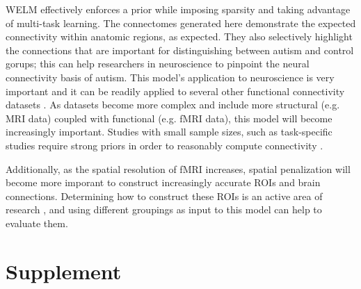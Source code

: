 \documentclass{article}
\begin{document}
WELM effectively enforces a prior while imposing sparsity and taking advantage of multi-task learning. The connectomes generated here demonstrate the expected connectivity within anatomic regions, as expected. They also selectively highlight the connections that are important for distinguishing between autism and control gorups; this can help researchers in neuroscience to pinpoint the neural connectivity basis of autism. This model's application to neuroscience is very important and it can be readily applied to several other functional connectivity datasets \cite{milham2012adhd,smith2013resting}. As datasets become more complex and include more structural (e.g. MRI data) coupled with functional (e.g. fMRI data), this model will become increasingly important. Studies with small sample sizes, such as task-specific studies require strong priors in order to reasonably compute connectivity \cite{real2017neural}.

Additionally, as the spatial resolution of fMRI increases, spatial penalization will become more imporant to construct increasingly accurate ROIs and brain connections. Determining how to construct these ROIs is an active area of research \cite{craddock2015connectomics,thirion2014fmri}, and using different groupings as input to this model can help to evaluate them.





\section*{Supplement}
\setcounter{figure}{0}
\renewcommand{\thefigure}{S\arabic{figure}}
\setcounter{table}{0}
\renewcommand{\thetable}{S\arabic{table}}
\end{document}
